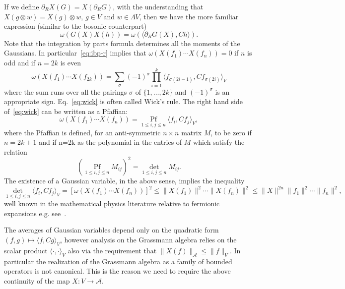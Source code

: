 \documentclass[11pt]{article}
\newcommand{\tmop}[1]{\ensuremath{\operatorname{#1}}}
\begin{document}
If we define $\partial_R X (G) = X (\partial_R G)$, with the understanding
that $X (g \otimes w) = X (g) \otimes w$, $g \in V$ and $w \in \Lambda V$,
then we have the more familiar expression (similar to the bosonic counterpart)
\[ \omega (G (X) X (h)) = \omega (\langle \partial_R G (X), C h \rangle) . \]
Note that the integration by parts formula determines all the moments of the
Gaussians. In particular~{\eqref{eq:ibp-r}} implies that $\omega (X (f_1)
\cdots X (f_n)) = 0$ if $n$ is odd and if $n = 2 k$ is even
\begin{equation}
  \omega (X (f_1) \cdots X (f_{2 k})) = \sum_{\sigma} (- 1)^{\sigma} \prod_{i
  = 1}^k \langle f_{\sigma (2 i - 1)}, C f_{\sigma (2 i)} \rangle_V
  \label{eq:wick}
\end{equation}
where the sum runs over all the pairings $\sigma$ of $\{ 1, \ldots, 2 k \}$
and $(- 1)^{\sigma}$ is an appropriate sign. Eq.~{\eqref{eq:wick}} is often
called Wick's rule. The right hand side of~{\eqref{eq:wick}} can be written as
a Pfaffian:
\begin{equation}
  \omega (X (f_1) \cdots X (f_n)) = \underset{1 \leqslant i, j \leqslant
  n}{\tmop{Pf}} \langle f_i, C f_j \rangle_V, \label{eq:pfaff}
\end{equation}
where the Pfaffian is defined, for an anti-symmetric $n \times n$ matrix $M$,
to be zero if $n = 2 k + 1$ and if n=2k as the polynomial in the entries of
$M$ which satisfy the relation
\[ (\underset{1 \leqslant i, j \leqslant n}{\tmop{Pf}} M_{i j})^2 =
   \underset{1 \leqslant i, j \leqslant n}{\det} M_{i j} . \]
The existence of a Gaussian variable, in the above sense, implies the
inequality
\[ \underset{1 \leqslant i, j \leqslant n}{\det} \langle f_i, C f_j \rangle_V
   = [\omega (X (f_1) \cdots X (f_n))]^2 \leqslant \| X (f_1) \|^2 \cdots \| X
   (f_n) \|^2 \leqslant \| X \|^{2 n} \| f_1 \|^2 \cdots \| f_n \|^2, \]
well known in the mathematical physics literature relative to fermionic
expansions e.g. see~{\cite{mastropietro_non-perturbative_2008}}.

\begin{remark}
  The averages of Gaussian variables depend only on the quadratic form $(f, g)
  \mapsto \langle f, C g \rangle_V$, however analysis on the Grassmann algebra
  relies on the scalar product $\langle \cdot, \cdot \rangle_V$ also via the
  requirement that $\| X (f) \|_{\mathcal{A}} \leqslant \| f \|_V$. In
  particular the realization of the Grassmann algebra as a family of bounded
  operators is not canonical. This is the reason we need to require the above
  continuity of the map $X : V \rightarrow \mathcal{A}$.
\end{remark}
\end{document}
